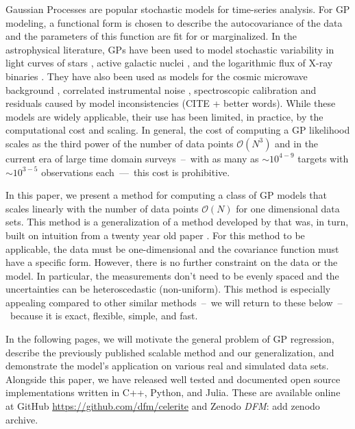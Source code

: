 \documentclass[manuscript, letterpaper]{aastex6}
\newcommand{\project}[1]{\textsf{#1}}
\newcommand{\todo}[3]{{\color{#2}\emph{#1}: #3}}
\newcommand{\dfmtodo}[1]{\todo{DFM}{red}{#1}}
\begin{document}
Gaussian Processes \citep[GPs;][]{Rasmussen:2006} are popular stochastic
models for time-series analysis.
For GP modeling, a functional form is chosen to describe the autocovariance
of the data and the parameters of this function are fit for or marginalized.
In the astrophysical literature, GPs have been used to model stochastic
variability in light curves of stars \citep{Brewer:2009}, active galactic
nuclei \citep{Kelly:2014}, and the logarithmic flux of X-ray binaries
\citep{Uttley:2005}.
They have also been used as models for the cosmic microwave background
\citep{Bond:1987,Bond:1999}, correlated instrumental noise
\citep{Gibson:2012}, spectroscopic calibration \citep{Czekala:2017,Evans:2015}
and residuals caused by model inconsistencies (CITE + better words).
While these models are widely applicable, their use has been limited, in
practice, by the computational cost and scaling.
In general, the cost of computing a GP likelihood scales as the third power of
the number of data points $\mathcal{O}(N^3)$ and in the current era of large
time domain surveys~--~with as many as $\sim10^{4-9}$ targets with
$\sim10^{3-5}$ observations each~---~this cost is prohibitive.

In this paper, we present a method for computing a class of GP models that
scales linearly with the number of data points $\mathcal{O}(N)$ for one
dimensional data sets.
This method is a generalization of a method developed by
\citet{Ambikasaran:2015} that was, in turn, built on intuition from a twenty
year old paper \citep{Rybicki:1995}.
For this method to be applicable, the data must be one-dimensional and the
covariance function must have a specific form.
However, there is no further constraint on the data or the model.
In particular, the measurements don't need to be evenly spaced and the
uncertainties can be heteroscedastic (non-uniform).
This method is especially appealing compared to other similar methods~--~we
will return to these below~--~because it is exact, flexible, simple, and fast.

In the following pages, we will motivate the general problem of GP regression,
describe the previously published scalable method \citep{Rybicki:1995,
Ambikasaran:2015} and our generalization, and demonstrate the model's
application on various real and simulated data sets.
Alongside this paper, we have released well tested and documented open source
implementations written in \project{C++}, \project{Python}, and
\project{Julia}.
These are available online at \project{GitHub}
\url{https://github.com/dfm/celerite} and \project{Zenodo} \dfmtodo{add zenodo
archive}.
\end{document}
